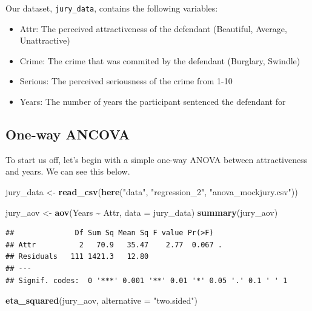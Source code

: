 \documentclass[
]{book}
\newenvironment{Shaded}{\begin{snugshade}}{\end{snugshade}}
\newcommand{\AttributeTok}[1]{\textcolor[rgb]{0.13,0.29,0.53}{#1}}
\newcommand{\FunctionTok}[1]{\textcolor[rgb]{0.13,0.29,0.53}{\textbf{#1}}}
\newcommand{\NormalTok}[1]{#1}
\newcommand{\OtherTok}[1]{\textcolor[rgb]{0.56,0.35,0.01}{#1}}
\newcommand{\SpecialCharTok}[1]{\textcolor[rgb]{0.81,0.36,0.00}{\textbf{#1}}}
\newcommand{\StringTok}[1]{\textcolor[rgb]{0.31,0.60,0.02}{#1}}
\providecommand{\tightlist}{%
  \setlength{\itemsep}{0pt}\setlength{\parskip}{0pt}}
\begin{document}
Our dataset, \texttt{jury\_data}, contains the following variables:

\begin{itemize}
\tightlist
\item
  Attr: The perceived attractiveness of the defendant (Beautiful, Average, Unattractive)
\item
  Crime: The crime that was commited by the defendant (Burglary, Swindle)
\item
  Serious: The perceived seriousness of the crime from 1-10
\item
  Years: The number of years the participant sentenced the defendant for
\end{itemize}

\hypertarget{one-way-ancova}{%
\subsection{One-way ANCOVA}\label{one-way-ancova}}

To start us off, let's begin with a simple one-way ANOVA between attractiveness and years. We can see this below.

\begin{Shaded}
\begin{Highlighting}[]
\NormalTok{jury\_data }\OtherTok{\textless{}{-}} \FunctionTok{read\_csv}\NormalTok{(}\FunctionTok{here}\NormalTok{(}\StringTok{"data"}\NormalTok{, }\StringTok{"regression\_2"}\NormalTok{, }\StringTok{"anova\_mockjury.csv"}\NormalTok{))}
\end{Highlighting}
\end{Shaded}

\begin{Shaded}
\begin{Highlighting}[]
\NormalTok{jury\_aov }\OtherTok{\textless{}{-}} \FunctionTok{aov}\NormalTok{(Years }\SpecialCharTok{\textasciitilde{}}\NormalTok{ Attr, }\AttributeTok{data =}\NormalTok{ jury\_data)}
\FunctionTok{summary}\NormalTok{(jury\_aov)}
\end{Highlighting}
\end{Shaded}

\begin{verbatim}
##              Df Sum Sq Mean Sq F value Pr(>F)  
## Attr          2   70.9   35.47    2.77  0.067 .
## Residuals   111 1421.3   12.80                 
## ---
## Signif. codes:  0 '***' 0.001 '**' 0.01 '*' 0.05 '.' 0.1 ' ' 1
\end{verbatim}

\begin{Shaded}
\begin{Highlighting}[]
\FunctionTok{eta\_squared}\NormalTok{(jury\_aov, }\AttributeTok{alternative =} \StringTok{"two.sided"}\NormalTok{)}
\end{Highlighting}
\end{Shaded}
\end{document}
